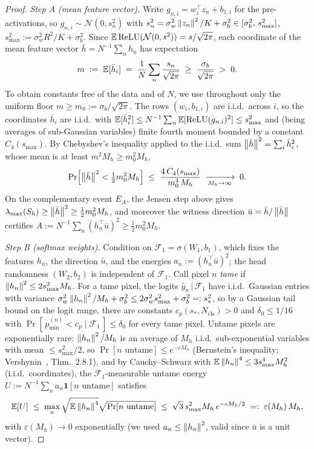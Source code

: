 \begin{proof}
\emph{Step A (mean feature vector).} Write
$g_{n,i} = w_i^\top z_n + b_{1,i}$ for the pre-activations, so
$g_{n,i} \sim \mathcal{N}(0, s_n^2)$ with
$s_n^2 = \sigma_w^2 \left\lVert z_n\right\rVert^2 / K + \sigma_b^2 \in
[\sigma_b^2,\, s_{\max}^2]$, $s_{\max}^2 := \sigma_w^2 R^2/K +
\sigma_b^2$. Since $\mathbb{E}\,\mathrm{ReLU}(\mathcal{N}(0, s^2)) =
s/\sqrt{2\pi}$, each coordinate of the mean feature vector
$\bar{h} = N^{-1} \sum_n h_n$ has expectation
\[
    m \;:=\; \mathbb{E}[\bar{h}_i]
    \;=\; \frac{1}{N} \sum_n \frac{s_n}{\sqrt{2\pi}}
    \;\geq\; \frac{\sigma_b}{\sqrt{2\pi}} \;>\; 0 .
\]
To obtain constants free of the data and of $N$, we use throughout
only the uniform floor $m \geq m_0 := \sigma_b/\sqrt{2\pi}$. The
rows $(w_i, b_{1,i})$ are i.i.d.\ across $i$, so the
coordinates $\bar{h}_i$ are i.i.d.\ with
$\mathbb{E}[\bar{h}_i^2] \leq N^{-1}\sum_n \mathbb{E}[\mathrm{ReLU}(g_{n,i})^2]
\leq s_{\max}^2$ and (being averages of sub-Gaussian variables)
finite fourth moment bounded by a constant $C_4(s_{\max})$. By
Chebyshev's inequality applied to the i.i.d.\ sum
$\left\lVert\bar{h}\right\rVert^2 = \sum_i \bar{h}_i^2$, whose mean is at least
$m^2 M_h \geq m_0^2 M_h$,
\[
    \Pr\!\left[ \left\lVert\bar{h}\right\rVert^2 < \tfrac{1}{2} m_0^2 M_h \right]
    \;\leq\; \frac{4\, C_4(s_{\max})}{m_0^4\, M_h}
    \;\xrightarrow[M_h \to \infty]{}\; 0 .
\]
On the complementary event $E_A$, the Jensen step above gives
$\lambda_{\max}(S_h) \geq \left\lVert\bar{h}\right\rVert^2 \geq \tfrac{1}{2} m_0^2
M_h$, and moreover the witness direction
$\bar{u} = \bar{h}/\left\lVert\bar{h}\right\rVert$ certifies
$A := N^{-1} \sum_n (h_n^\top \bar{u})^2 \geq \tfrac{1}{2} m_0^2
M_h$.

\emph{Step B (softmax weights).} Condition on
$\mathcal{F}_1 = \sigma(W_1, b_1)$, which fixes the features $h_n$,
the direction $\bar{u}$, and the energies
$a_n := (h_n^\top \bar{u})^2$; the head randomness $(W_2, b_2)$ is
independent of $\mathcal{F}_1$. Call pixel $n$ \emph{tame} if
$\left\lVert h_n\right\rVert^2 \leq 2 s_{\max}^2 M_h$. For a tame pixel, the logits
$\hat{y}_n \,|\, \mathcal{F}_1$ have i.i.d.\ Gaussian entries with
variance $\sigma_w^2 \left\lVert h_n\right\rVert^2/M_h + \sigma_b^2 \leq
2\sigma_w^2 s_{\max}^2 + \sigma_b^2 =: s_*^2$, so by a Gaussian
tail bound on the logit range, there are constants
$c_p(s_*, N_{\mathrm{cls}}) > 0$ and $\delta_0 \leq 1/16$ with
$\Pr[\, p^{(n)}_{\min} < c_p \mid \mathcal{F}_1 \,] \leq \delta_0$
for every tame pixel. Untame pixels are exponentially rare:
$\left\lVert h_n\right\rVert^2/M_h$ is an average of $M_h$ i.i.d.\ sub-exponential
variables with mean $\leq s_{\max}^2/2$, so
$\Pr[\text{$n$ untame}] \leq e^{-c M_h}$
(Bernstein's inequality; Vershynin~\cite{vershynin2018high},
Thm.~2.8.1), and by Cauchy--Schwarz with
$\mathbb{E}\left\lVert h_n\right\rVert^4 \leq 3 s_{\max}^4 M_h^2$ (i.i.d.\ coordinates), the
$\mathcal{F}_1$-measurable untame energy
$U := N^{-1} \sum_n a_n \mathbf{1}[\text{$n$ untame}]$ satisfies
\[
    \mathbb{E}[U]
    \;\leq\; \max_n \sqrt{\mathbb{E}\left\lVert h_n\right\rVert^4}
        \sqrt{\Pr[\text{$n$ untame}]}
    \;\leq\; \sqrt{3}\, s_{\max}^2 M_h\, e^{-c M_h / 2}
    \;=:\; \varepsilon(M_h)\, M_h ,
\]
with $\varepsilon(M_h) \to 0$ exponentially (we used
$a_n \leq \left\lVert h_n\right\rVert^2$, valid since $\bar{u}$ is a unit vector).


\end{proof}
